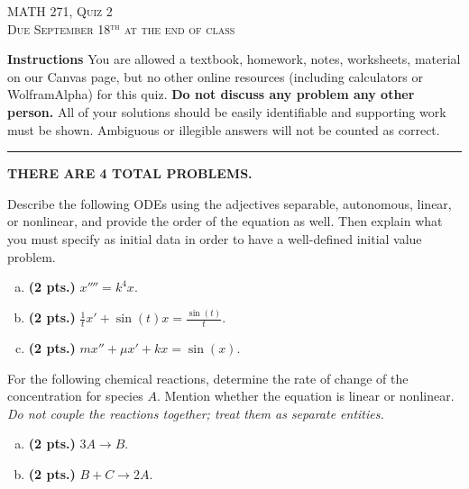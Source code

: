 \documentclass[12pt]{amsbook}
\begin{document}

\begin{center}
   \textsc{\large MATH 271, Quiz 2}\\
   \textsc{Due September 18$^\textrm{th}$ at the end of class}
\end{center}

\vspace{1cm}

\noindent\textbf{Instructions} \; You are allowed a textbook, homework, notes, worksheets, material on our Canvas page, but no other online resources (including calculators or WolframAlpha) for this quiz.  \textbf{Do not discuss any problem any other person.} All of your solutions should be easily identifiable and supporting work must be shown.  Ambiguous or illegible answers will not be counted as correct.


\vspace*{.5cm}
\hrule
\vspace*{.5cm}

\begin{center}\textbf{\large THERE ARE 4 TOTAL PROBLEMS.}\normalsize \end{center}

\begin{problem}
Describe the following ODEs using the adjectives separable, autonomous, linear, or nonlinear, and provide the order of the equation as well. Then explain what you must specify as initial data in order to have a well-defined initial value problem.
\begin{enumerate}[(a)]
	\item \textbf{(2 pts.)} $x'''' = k^4 x$.
	\item \textbf{(2 pts.)} $\frac{1}{t} x' + \sin(t) x = \frac{\sin(t)}{t}$.
	\item \textbf{(2 pts.)} $mx''+\mu x' + kx = \sin(x)$.
\end{enumerate}
\end{problem}

\begin{problem}
For the following chemical reactions, determine the rate of change of the concentration for species $A$.  Mention whether the equation is linear or nonlinear. \emph{Do not couple the reactions together; treat them as separate entities.}
\begin{enumerate}[(a)]
    \item \textbf{(2 pts.)} $3A \to B$.
    \item \textbf{(2 pts.)} $B+C \to 2A$. 
\end{enumerate}
\end{problem}
\end{document}
